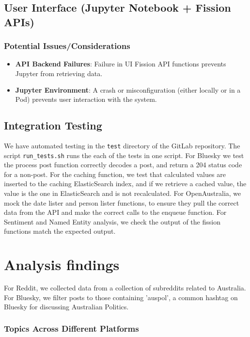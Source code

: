 \documentclass[]{article}
\numberwithin{equation}{section}
\begin{document}
\subsection*{User Interface (Jupyter Notebook + Fission APIs)}

\subsubsection*{Potential Issues/Considerations}
\begin{itemize}
  \item \textbf{API Backend Failures}: Failure in UI Fission API functions prevents Jupyter from retrieving data.
  \item \textbf{Jupyter Environment}: A crash or misconfiguration (either locally or in a Pod) prevents user interaction with the system.
\end{itemize}


\subsection*{Integration Testing}

We have automated testing in the \texttt{test} directory of the GitLab repository. 
The script \texttt{run\_tests.sh} runs the each of the tests in one script.
For Bluesky we test the process post function correctly decodes a post, and return a 204 status code for a non-post.
For the caching function, we test that calculated values are inserted to the caching ElasticSearch index, and if we retrieve a cached value, the value is the one in ElasticSearch and is not recalculated.
For OpenAustralia, we mock the date lister and person lister functions, to ensure they pull the correct data from the API and make the correct calls to the enqueue function.
For Sentiment and Named Entity analysis, we check the output of the fission functions match the expected output.

\section*{Analysis findings}

For Reddit, we collected data from a collection of subreddits related to Australia.
For Bluesky, we filter posts to those containing 'auspol', a common hashtag on Bluesky for discussing Australian Politics.

\subsubsection*{Topics Across Different Platforms}
\end{document}
